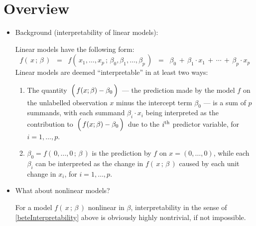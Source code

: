 

\section{Overview}
\setcounter{theorem}{0}
\setcounter{equation}{0}


\renewcommand{\theenumi}{\roman{enumi}}
\renewcommand{\labelenumi}{\textnormal{(\theenumi)}$\;\;$}


\begin{itemize}
\item
	Background (interpretability of linear models):
	
	Linear models have the following form:
	\begin{equation*}
	f(\,x\,;\,\beta\,)
	\;\; = \;\;
		f(\,x_{1},\ldots,x_{p}\,;\,\beta_{0},\beta_{1},\ldots,\beta_{p}\,)
	\;\; = \;\;
		\beta_{0} \,+\, \beta_{1}\cdot x_{1} \,+\, \cdots \,+\, \beta_{p}\cdot x_{p}
	\end{equation*}
	Linear models are deemed ``interpretable'' in at least two ways:
	\begin{enumerate}
	\item
		\label{additiveModelDecomposition}
		The quantity
		\,$\left(\,f(x;\beta) \overset{{\color{white}.}}{-} \beta_{0}\,\right)$\,
		--- the prediction made by the model $f$ on the unlabelled observation $x$
		minus the intercept term $\beta_{0}$ --- is a sum of $p$ summands,
		with each summand $\beta_{i}\cdot x_{i}$ being interpreted as the contribution to 
		\,$\left(\,f(x;\beta) \overset{{\color{white}.}}{-} \beta_{0}\,\right)$\,
		due to the $i^{\textnormal{th}}$ predictor variable, for $i = 1,\ldots,p$.
	\item
		\label{beteInterpretability}
		$\beta_{0} = f(\,0,\ldots,0\,;\,\beta\,)$ is the prediction by $f$ on $x = (0,\ldots,0)$,
		while each $\beta_{i}$ can be interpreted as the change in $f(\,x\,;\,\beta\,)$
		caused by each unit change in $x_{i}$, for $i = 1,\ldots,p$.
	\end{enumerate}
\item
	What about nonlinear models?
	
	For a model $f(\,x\,;\,\beta\,)$ nonlinear in $\beta$, interpretability in the sense of
	\eqref{beteInterpretability} above is obviously highly nontrivial, if not impossible.
	

\end{itemize}

